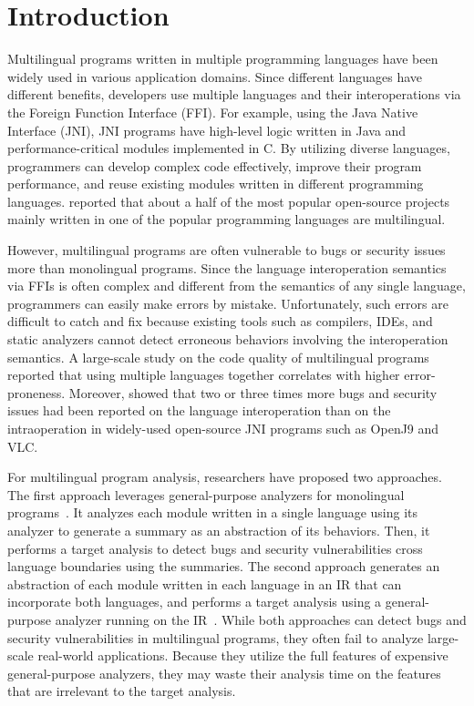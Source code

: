 \section{Introduction}
Multilingual programs written in multiple programming languages
have been widely used in various application domains.
Since different languages have different benefits,
developers use multiple languages and their interoperations
via the Foreign Function Interface (FFI). For example, using the Java Native Interface (JNI),
JNI programs have high-level logic written in Java and performance-critical
modules implemented in C. By utilizing diverse languages, programmers can
develop complex code effectively, improve their program performance,
and reuse existing modules written in different programming languages.
\citet{kochhar2016large} reported that about a half of the most popular open-source
projects mainly written in one of the popular programming languages are
multilingual.

However, multilingual programs are often vulnerable to bugs or security issues
more than monolingual programs. Since the language interoperation semantics
via FFIs is often complex and different from the semantics of any
single language, programmers can easily make errors by mistake.
Unfortunately, such errors are difficult to catch and fix because existing
tools such as compilers, IDEs, and static analyzers cannot detect erroneous
behaviors involving the interoperation semantics.
A large-scale study on the code quality of multilingual programs~\cite{kochhar2016large}
reported that using multiple languages together correlates with higher error-proneness.  
Moreover, \citet{grichi2020impact} showed that two or three times more
bugs and security issues had been reported on the language
interoperation than on the intraoperation in widely-used open-source JNI
programs such as OpenJ9 and VLC.

For multilingual program analysis, researchers have proposed two approaches.
The first approach leverages general-purpose analyzers for monolingual
programs~\cite{JN-SAF, LeeASE20}.  It analyzes each module
written in a single language using its analyzer to generate
a summary as an abstraction of its behaviors.  Then, it performs a target
analysis to detect bugs and security vulnerabilities cross language boundaries
using the summaries. The second approach generates an abstraction
of each module written in each language in an IR that can
incorporate both languages, and performs
a target analysis using a general-purpose analyzer
running on the IR~\cite{hybridroid, cpython}.
While both approaches can detect bugs and security vulnerabilities
in multilingual programs, they often fail to analyze large-scale real-world applications.
Because they utilize the full features of expensive general-purpose analyzers,
they may waste their analysis time on the features that are irrelevant to
the target analysis.

